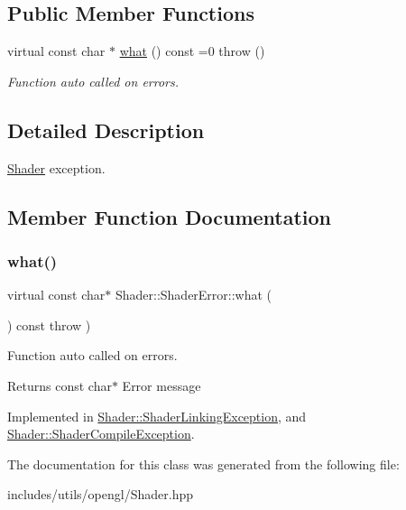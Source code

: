 \subsection*{Public Member Functions}
\begin{DoxyCompactItemize}
\item 
virtual const char $\ast$ \hyperlink{class_shader_1_1_shader_error_aae7a37e1a4590a9347142d236e62372a}{what} () const =0  throw ()
\begin{DoxyCompactList}\small\item\em Function auto called on errors. \end{DoxyCompactList}\end{DoxyCompactItemize}


\subsection{Detailed Description}
\hyperlink{class_shader}{Shader} exception. 

\subsection{Member Function Documentation}
\mbox{\label{class_shader_1_1_shader_error_aae7a37e1a4590a9347142d236e62372a}} 
\subsubsection{\texorpdfstring{what()}{what()}}
{\footnotesize\ttfamily virtual const char$\ast$ Shader\+::\+Shader\+Error\+::what (\begin{DoxyParamCaption}{ }\end{DoxyParamCaption}) const throw  ) \hspace{0.3cm}{\ttfamily [pure virtual]}}



Function auto called on errors. 

\begin{DoxyReturn}{Returns}
const char$\ast$ Error message 
\end{DoxyReturn}


Implemented in \hyperlink{class_shader_1_1_shader_linking_exception_a99267f7b7ba184b4ccd2e5e50650cf95}{Shader\+::\+Shader\+Linking\+Exception}, and \hyperlink{class_shader_1_1_shader_compile_exception_a519cca6165fcabbe8bbd269bb4b22153}{Shader\+::\+Shader\+Compile\+Exception}.



The documentation for this class was generated from the following file\+:\begin{DoxyCompactItemize}
\item 
includes/utils/opengl/Shader.\+hpp\end{DoxyCompactItemize}
